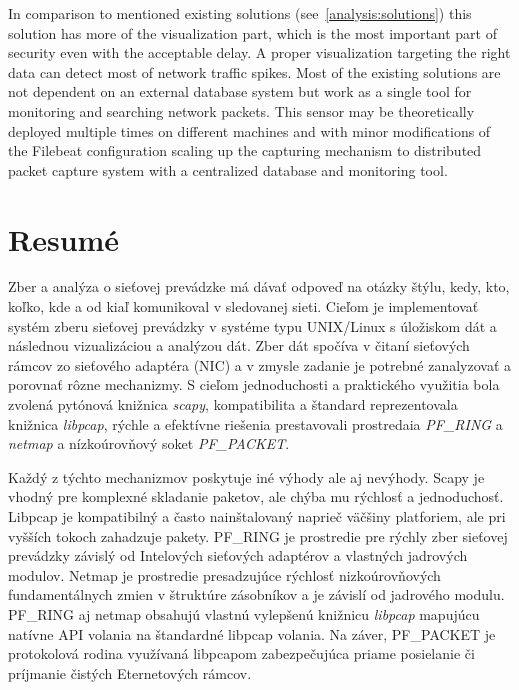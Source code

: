 \documentclass[12pt,a4paper,twoside]{book}
\begin{document}
    In comparison to mentioned existing solutions (see~\autoref{analysis:solutions}) this solution has more of the visualization part, which is the most important part of security even with the acceptable delay. A proper visualization targeting the right data can detect most of network traffic spikes. Most of the existing solutions are not dependent on an external database system but work as a single tool for monitoring and searching network packets. This sensor may be theoretically deployed multiple times on different machines and with minor modifications of the Filebeat configuration scaling up the capturing mechanism to distributed packet capture system with a centralized database and monitoring tool.

\chapter{Resumé}
    Zber a analýza o sieťovej prevádzke má dávať odpoveď na otázky štýlu, kedy, kto, koľko, kde a od kiaľ komunikoval v sledovanej sieti. Cieľom je implementovať systém zberu sieťovej prevádzky v systéme typu UNIX/Linux s úložiskom dát a následnou vizualizáciou a analýzou dát. Zber dát spočíva v čitaní sieťových rámcov zo sieťového adaptéra (NIC) a v zmysle zadanie je potrebné zanalyzovať a porovnať rôzne mechanizmy. S cieľom jednoduchosti a praktického využitia bola zvolená pytónová knižnica \emph{scapy}, kompatibilita a štandard reprezentovala knižnica \emph{libpcap}, rýchle a efektívne riešenia prestavovali prostredaia \emph{PF\_RING} a \emph{netmap} a nízkoúrovňový soket \emph{PF\_PACKET}.\par
    Každý z týchto mechanizmov poskytuje iné výhody ale aj nevýhody. Scapy je vhodný pre komplexné skladanie paketov, ale chýba mu rýchlosť a jednoduchosť. Libpcap je kompatibilný a často nainštalovaný naprieč väčšiny platforiem, ale pri vyšších tokoch zahadzuje pakety. PF\_RING je prostredie pre rýchly zber sieťovej prevádzky závislý od Intelových sieťových adaptérov a vlastných jadrových modulov. Netmap je prostredie presadzujúce rýchlosť nizkoúrovňových fundamentálnych zmien v štruktúre zásobníkov a je závislí od jadrového modulu. PF\_RING aj netmap obsahujú vlastnú vylepšenú knižnicu \emph{libpcap} mapujúcu natívne API volania na štandardné libpcap volania. Na záver, PF\_PACKET je protokolová rodina využívaná libpcapom zabezpečujúca priame posielanie či príjmanie čistých Eternetových rámcov.\par
\end{document}
